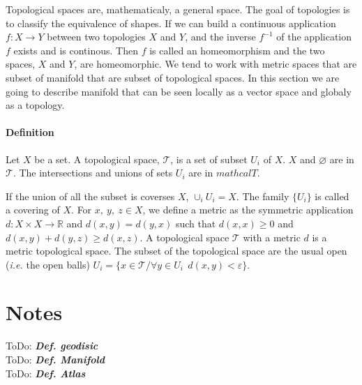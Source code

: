 \documentclass[final, paper=letter,5p,times,twocolumn]{elsarticle}
\newcommand{\ToDo}[1]{ToDo: \textbf{\textit{#1}}}
\theoremstyle{definition}
\begin{document}
Topological spaces are, mathematicaly, a general space. The goal of  topologies is to classify the equivalence of shapes. If we can build a continuous application $f : X \rightarrow Y$ between two topologies $X$ and $Y$, and the inverse $f^{-1}$ of the application $f$ exists and is continous. Then $f$ is called an homeomorphism and the two spaces, $X$ and $Y$, are homeomorphic.
We tend to work with metric spaces that are subset of manifold that are subset of topological spaces. In this section we are going to describe manifold that can be seen locally as a vector space and globaly as a topology.

\paragraph{Definition}{Let $X$ be a set. A topological space, $\mathcal{T}$, is a set of subset $U_{i}$ of $X$. $X$ and $\varnothing$ are in $\mathcal{T}$. The intersections and unions of sets $U_{i}$ are in $mathcal{T}$.

If the union of all the subset is coverses $X$, $\cup_{i} U_{i} = X$. The family $\{U_{i} \}$ is called a covering of $X$.
For $x,~y,~z \in X$, we define a metric as the symmetric application $d : X \times X \rightarrow \mathbb{R}$ and $d(x,y) = d(y,x)$ such that $d(x,x) \ge 0$ and $d(x,y) + d(y,z) \ge d(x,z)$. A topological space $\mathcal{T}$ with a metric $d$ is a metric topological space. The subset of the topological space are the usual open ({\it i.e.} the open balls) $U_{i} = \{ x \in \mathcal{T} / \forall y \in U_{i} ~~ d(x,y) < \varepsilon \}$.
  




\section{Notes}

\ToDo{Def. geodisic} \\
\ToDo{Def. Manifold} \\
\ToDo{Def. Atlas} \\


}
\end{document}
